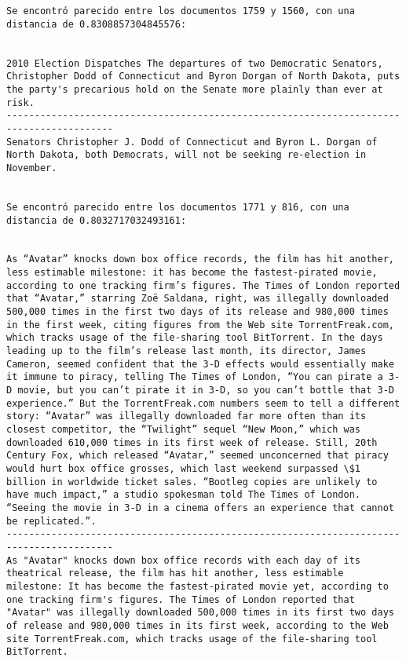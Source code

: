 \documentclass[11pt]{article}
\begin{document}
\begin{Verbatim}[commandchars=\\\{\}]
Se encontró parecido entre los documentos 1759 y 1560, con una distancia de 0.8308857304845576:


2010 Election Dispatches The departures of two Democratic Senators, Christopher Dodd of Connecticut and Byron Dorgan of North Dakota, puts the party's precarious hold on the Senate more plainly than ever at risk.
-----------------------------------------------------------------------------------------
Senators Christopher J. Dodd of Connecticut and Byron L. Dorgan of North Dakota, both Democrats, will not be seeking re-election in November. 


Se encontró parecido entre los documentos 1771 y 816, con una distancia de 0.8032717032493161:


As “Avatar” knocks down box office records, the film has hit another, less estimable milestone: it has become the fastest-pirated movie, according to one tracking firm’s figures. The Times of London reported that “Avatar,” starring Zoë Saldana, right, was illegally downloaded 500,000 times in the first two days of its release and 980,000 times in the first week, citing figures from the Web site TorrentFreak.com, which tracks usage of the file-sharing tool BitTorrent. In the days leading up to the film’s release last month, its director, James Cameron, seemed confident that the 3-D effects would essentially make it immune to piracy, telling The Times of London, “You can pirate a 3-D movie, but you can’t pirate it in 3-D, so you can’t bottle that 3-D experience.” But the TorrentFreak.com numbers seem to tell a different story: “Avatar” was illegally downloaded far more often than its closest competitor, the “Twilight” sequel “New Moon,” which was downloaded 610,000 times in its first week of release. Still, 20th Century Fox, which released “Avatar,” seemed unconcerned that piracy would hurt box office grosses, which last weekend surpassed \$1 billion in worldwide ticket sales. “Bootleg copies are unlikely to have much impact,” a studio spokesman told The Times of London. “Seeing the movie in 3-D in a cinema offers an experience that cannot be replicated.”.
-----------------------------------------------------------------------------------------
As "Avatar" knocks down box office records with each day of its theatrical release, the film has hit another, less estimable milestone: It has become the fastest-pirated movie yet, according to one tracking firm's figures. The Times of London reported that "Avatar" was illegally downloaded 500,000 times in its first two days of release and 980,000 times in its first week, according to the Web site TorrentFreak.com, which tracks usage of the file-sharing tool BitTorrent.



\end{Verbatim}
\end{document}
